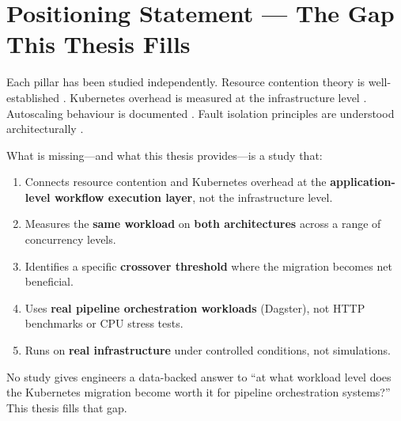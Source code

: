 
\section{Positioning Statement --- The Gap This Thesis Fills}
\label{sec:positioning}

Each pillar has been studied independently. Resource contention theory is well-established \citep{nanda1991, arora2023}. Kubernetes overhead is measured at the infrastructure level \citep{casalicchio2019, liu2024}. Autoscaling behaviour is documented \citep{nguyen2020, tran2022, choi2021}. Fault isolation principles are understood architecturally \citep{cilic2023}.

What is missing---and what this thesis provides---is a study that:

\begin{enumerate}
  \item Connects resource contention and Kubernetes overhead at the \textbf{application-level workflow execution layer}, not the infrastructure level.
  \item Measures the \textbf{same workload} on \textbf{both architectures} across a range of concurrency levels.
  \item Identifies a specific \textbf{crossover threshold} where the migration becomes net beneficial.
  \item Uses \textbf{real pipeline orchestration workloads} (Dagster), not HTTP benchmarks or CPU stress tests.
  \item Runs on \textbf{real infrastructure} under controlled conditions, not simulations.
\end{enumerate}

No study gives engineers a data-backed answer to ``at what workload level does the Kubernetes migration become worth it for pipeline orchestration systems?'' This thesis fills that gap.
